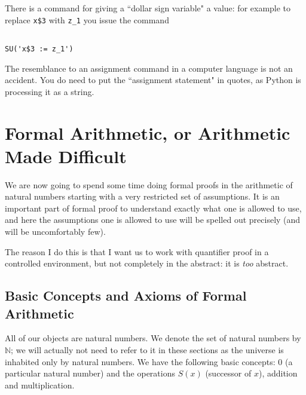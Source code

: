 \documentclass[12pt]{article}
\begin{document}
There is a command for giving a ``dollar sign variable" a value:  for example to replace {\tt x\$3} with {\tt z\_1} you issue the command

\begin{verbatim}

SU('x$3 := z_1')

\end{verbatim}

The resemblance to an assignment command in a computer language is not an accident.  You do need to put the ``assignment statement" in quotes, as Python is processing it as a string.

\section{Formal Arithmetic, or Arithmetic Made Difficult}

We are now going to spend some time doing formal proofs in the
arithmetic of natural numbers starting with a very restricted set of
assumptions.  It is an important part of formal proof to understand
exactly what one is allowed to use, and here the assumptions one is
allowed to use will be spelled out precisely (and will be
uncomfortably few).

The reason I do this is that I want us to work with quantifier proof in a controlled environment, but not completely in the abstract:  it is {\em too\/} abstract.

\subsection{Basic Concepts and Axioms of Formal Arithmetic}

All of our objects are natural numbers.  We denote the set of natural
numbers by ${\mathbb N}$; we will actually not need to refer to it in
these sections as the universe is inhabited only by natural numbers.
We have the following basic concepts:  0 (a particular natural number)
and the operations $S(x)$ (successor of $x$), addition and multiplication.
\end{document}
